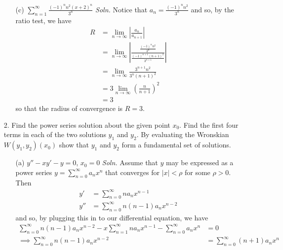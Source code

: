 \documentclass{article}
\begin{document}
\begin{itemize}
\begin{itemize}
        \item[(c)] $\sum_{n = 1}^{\infty} \frac{(-1)^n n^2 (x + 2)^n}{3^n}$
        \newline\newline
        \textit{Soln.} Notice that $a_n = \frac{(-1)^n n^2}{3^n}$ and so, by the ratio test, we have
        \begin{align*}
            R &= \lim_{n \to \infty} \left|\frac{a_n}{a_{n+1}}\right|\\
            &= \lim_{n \to \infty} \left|\frac{\frac{(-1)^nn^2}{3^n}}{\frac{(-1)^{n+1}(n+1)^2}{3^{n+1}}}\right|\\
            &= \lim_{n \to \infty} \frac{3^{n+1}n^2}{3^n(n+1)^2}\\
            &= 3\lim_{n \to \infty} \left(\frac{n}{n+1}\right)^2\\
            &= 3
        \end{align*}
        so that the radius of convergence is $R = 3$.
    \end{itemize}
    \pagebreak
    \item[2.] Find the power series solution about the given point $x_0$. Find the first four terms in each of the two solutions $y_1$ and $y_2$. By evaluating the Wronskian $W(y_1, y_2)(x_0)$ show that $y_1$ and $y_2$ form a fundamental set of solutions.
    \begin{itemize}
        \item[(a)] $y'' - xy' - y = 0$, \hspace{0.5cm} $x_0 = 0$
        \newline\newline
        \textit{Soln.} Assume that $y$ may be expressed as a power series $y = {\displaystyle \sum_{n = 0}^{\infty} a_n x^n}$ that converges for $|x| < \rho$ for some $\rho > 0$. Then 
        \begin{align*}
            y' &= \sum_{n = 0}^{\infty} na_nx^{n-1}\\
            y'' &= \sum_{n = 0}^{\infty} n(n-1)a_nx^{n-2}
        \end{align*}
        and so, by plugging this in to our differential equation, we have
        \begin{align*}
            \sum_{n = 0}^{\infty} n(n-1)a_nx^{n-2} - x\sum_{n = 1}^{\infty} na_n x^{n-1} - \sum_{n = 0}^{\infty}a_nx^n &= 0\\
            \implies \sum_{n = 0}^{\infty} n(n-1)a_nx^{n-2} &= \sum_{n = 0}^{\infty} (n + 1)a_nx^n
        \end{align*}

\end{itemize}
\end{itemize}
\end{document}
